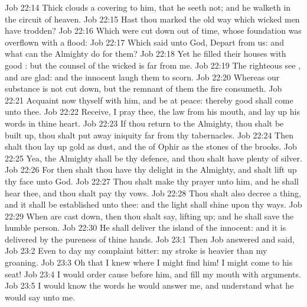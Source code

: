 \vs Job 22:14 Thick clouds  a covering to him, that he seeth not; and he walketh in the circuit of heaven.
\vs Job 22:15 Hast thou marked the old way which wicked men have trodden?
\vs Job 22:16 Which were cut down out of time, whose foundation was overflown with a flood:
\vs Job 22:17 Which said unto God, Depart from us: and what can the Almighty do for them?
\vs Job 22:18 Yet he filled their houses with good : but the counsel of the wicked is far from me.
\vs Job 22:19 The righteous see , and are glad: and the innocent laugh them to scorn.
\vs Job 22:20 Whereas our substance is not cut down, but the remnant of them the fire consumeth.
\vs Job 22:21 Acquaint now thyself with him, and be at peace: thereby good shall come unto thee.
\vs Job 22:22 Receive, I pray thee, the law from his mouth, and lay up his words in thine heart.
\vs Job 22:23 If thou return to the Almighty, thou shalt be built up, thou shalt put away iniquity far from thy tabernacles.
\vs Job 22:24 Then shalt thou lay up gold as dust, and the  of Ophir as the stones of the brooks.
\vs Job 22:25 Yea, the Almighty shall be thy defence, and thou shalt have plenty of silver.
\vs Job 22:26 For then shalt thou have thy delight in the Almighty, and shalt lift up thy face unto God.
\vs Job 22:27 Thou shalt make thy prayer unto him, and he shall hear thee, and thou shalt pay thy vows.
\vs Job 22:28 Thou shalt also decree a thing, and it shall be established unto thee: and the light shall shine upon thy ways.
\vs Job 22:29 When  are cast down, then thou shalt say,  lifting up; and he shall save the humble person.
\vs Job 22:30 He shall deliver the island of the innocent: and it is delivered by the pureness of thine hands.
\vs Job 23:1 Then Job answered and said,
\vs Job 23:2 Even to day  my complaint bitter: my stroke is heavier than my groaning.
\vs Job 23:3 Oh that I knew where I might find him!  I might come  to his seat!
\vs Job 23:4 I would order  cause before him, and fill my mouth with arguments.
\vs Job 23:5 I would know the words  he would answer me, and understand what he would say unto me.
